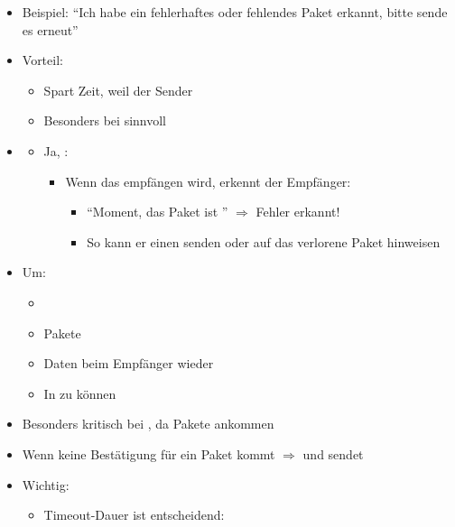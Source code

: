 \begin{itemize}
    \item Beispiel: \enquote{Ich habe ein fehlerhaftes oder fehlendes Paket erkannt, bitte sende es erneut}
    \item Vorteil:
    \begin{itemize}
        \item Spart Zeit, weil der Sender 
        \item Besonders bei  sinnvoll
    \end{itemize}
    \item {}
    \begin{itemize}
        \item Ja, :
        \begin{itemize}
            \item Wenn das  empfängen wird, erkennt der Empfänger:
            \begin{itemize}
                \item \enquote{Moment, das Paket ist } $\Rightarrow$ Fehler erkannt!
                \item So kann er einen  senden oder auf das verlorene Paket hinweisen
            \end{itemize}
        \end{itemize}
    \end{itemize}
\end{itemize}
\begin{itemize}
    \item Um:
    \begin{itemize}
        \item {}
        \item Pakete 
        \item Daten beim Empfänger wieder 
        \item In  zu können
    \end{itemize}
    \item Besonders kritisch bei , da Pakete  ankommen
\end{itemize}
\begin{itemize}
    \item Wenn keine Bestätigung für ein Paket kommt $\Rightarrow$  und sendet 
    \item Wichtig:
    \begin{itemize}
        \item Timeout-Dauer ist entscheidend: 
    \end{itemize}
\end{itemize}
